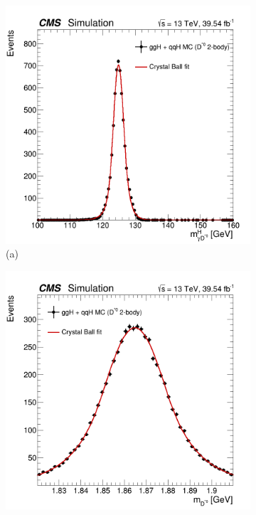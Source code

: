 \begin{figure}[!ht]
    \captionsetup[subfigure]{labelformat=empty}
    \vspace*{-0.2cm}
    \centering
    \setlength{\mylength}{\textwidth}
    \begin{subfigure}[t]{0.50\mylength}
        \centering
        \includegraphics[width=0.49\mylength]{resources/plots/D0Star_2body_fit_SGN_MH.png}
        \vspace*{-0.2cm}
        \caption{\footnotesize (a)}
    \end{subfigure}%
    \begin{subfigure}[t]{0.50\mylength}
        \centering
        \includegraphics[width=0.49\mylength]{resources/plots/D0Star_2body_fit_SGN_MM.png}

\end{subfigure}
\end{figure}
